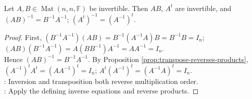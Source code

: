 \begin{corollary} \label{cor:matrix-inverse-product-and-transpose} \\
Let $A,B\in\operatorname{Mat}(n,n,\mathbb{F})$ be invertible. Then $AB$, $A^t$ are invertible, and $(AB)^{-1}=B^{-1}A^{-1}$; $(A^t)^{-1}=(A^{-1})^t$.
\begin{proof}
First, $(B^{-1}A^{-1})(AB)=B^{-1}(A^{-1}A)B=B^{-1}B=I_n$; $(AB)(B^{-1}A^{-1})=A(BB^{-1})A^{-1}=AA^{-1}=I_n$.\\
Hence $(AB)^{-1}=B^{-1}A^{-1}$. By Proposition \ref{prop:transpose-reverses-products}, $(A^{-1})^tA^t=(AA^{-1})^t=I_n$; $A^t(A^{-1})^t=(A^{-1}A)^t=I_n$.\\
: Inversion and transposition both reverse multiplication order.\\
: Apply the defining inverse equations and reverse products.
\end{proof}
\end{corollary}
